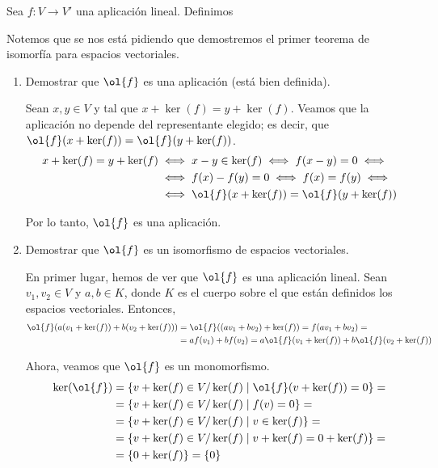 \documentclass[12pt]{article}
\begin{document}
	\newpage
	\setcounter{ejercicio}{0} %
	
\begin{ejercicio}
	Sea $f : V \to V'$ una aplicación lineal. Definimos
	\begin{observacion}
		Notemos que se nos está pidiendo que demostremos el primer teorema de isomorfía para espacios vectoriales.
	\end{observacion}
	\begin{enumerate}
		\item Demostrar que $\ol{f}$ es una aplicación (está bien definida).
		
		Sean $x,y \in V$ y tal que $x + \ker(f) = y + \ker(f)$. Veamos que la aplicación no depende del representante elegido; es decir, que $\ol{f}(x + \ker(f)) = \ol{f}(y + \ker(f))$.
		\begin{align*}
			x + \ker(f) = y + \ker(f)
			&\iff x - y \in \ker(f)
			\iff f(x - y) = 0\iff \\ &
			\iff f(x) - f(y) = 0 
			\iff f(x) = f(y)\iff \\ &
			\iff \ol{f}(x + \ker(f)) = \ol{f}(y + \ker(f))
		\end{align*}

		Por lo tanto, $\ol{f}$ es una aplicación.
		\item Demostrar que $\ol{f}$ es un isomorfismo de espacios vectoriales.
		
		En primer lugar, hemos de ver que $\ol{f}$ es una aplicación lineal. Sean $v_1, v_2 \in V$ y $a,b \in K$, donde $K$ es el cuerpo sobre el que están definidos los espacios vectoriales. Entonces,
		\begin{align*}
			\ol{f}(a(v_1 + \ker(f)) + b(v_2 + \ker(f)))
			&= \ol{f}((av_1 + bv_2) + \ker(f)) = f(av_1 + bv_2) = \\ &
			= af(v_1) + bf(v_2) = a\ol{f}(v_1 + \ker(f)) + b\ol{f}(v_2 + \ker(f))
		\end{align*}

		Ahora, veamos que $\ol{f}$ es un monomorfismo.
		\begin{align*}
			\ker(\ol{f}) &= \{v + \ker(f) \in V/\ker(f) \mid \ol{f}(v + \ker(f)) = 0\}
			=\\&= \{v + \ker(f) \in V/\ker(f) \mid f(v) = 0\}
			=\\&= \{v + \ker(f) \in V/\ker(f) \mid v \in \ker(f)\}
			=\\&= \{v + \ker(f) \in V/\ker(f) \mid v + \ker(f) = 0 + \ker(f)\}
			=\\&= \{0 + \ker(f)\}
			= \{0\}
		\end{align*}


\end{enumerate}
\end{ejercicio}
\end{document}
